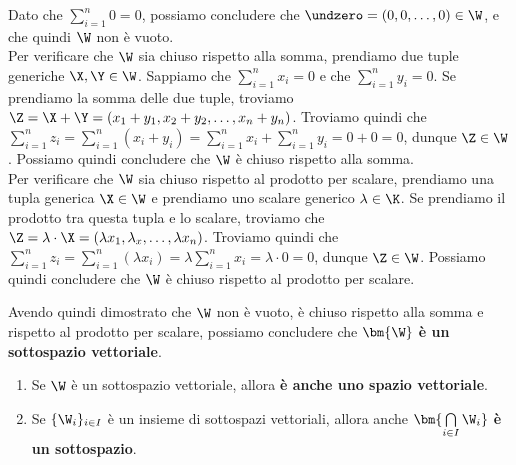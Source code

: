 \documentclass[11pt, a4paper, titlepage, oneside]{scrbook}
\begin{document}
Dato che $\sum_{i = 1}^n 0 = 0$, possiamo concludere che $\undzero = (0,0,\ldots,0) \in \W$, e che quindi $\W$ non è vuoto. \\
Per verificare che $\W$ sia chiuso rispetto alla somma, prendiamo due tuple generiche $\X, \Y \in \W$. Sappiamo che $\sum_{i = 1}^n x_i = 0$ e che $\sum_{i = 1}^n y_i = 0$. Se prendiamo la somma delle due tuple, troviamo $\Z = \X + \Y = (x_1 + y_1, x_2 + y_2, \ldots, x_n + y_n)$. Troviamo quindi che $\sum_{i = 1}^n z_i = \sum_{i = 1}^n(x_i + y_i) = \sum_{i = 1}^n x_i + \sum_{i = 1}^n y_i = 0 + 0 = 0$, dunque $\Z \in \W$. Possiamo quindi concludere che $\W$ è chiuso rispetto alla somma. \\
Per verificare che $\W$ sia chiuso rispetto al prodotto per scalare, prendiamo una tupla generica $\X \in \W$ e prendiamo uno scalare generico $\lambda \in \K$. Se prendiamo il prodotto tra questa tupla e lo scalare, troviamo che $\Z = \lambda \cdot \X = (\lambda x_1, \lambda_x, \ldots, \lambda x_n)$. Troviamo quindi che $\sum_{i = 1}^n z_i = \sum_{i = 1}^n (\lambda x_i) = \lambda \sum_{i = 1}^n x_i = \lambda \cdot 0 = 0$, dunque $\Z \in \W$. Possiamo quindi concludere che $\W$ è chiuso rispetto al prodotto per scalare.

Avendo quindi dimostrato che $\W$ non è vuoto, è chiuso rispetto alla somma e rispetto al prodotto per scalare, possiamo concludere che $\bm{\W}$ \textbf{è un sottospazio vettoriale}.

\begin{Osservazione}[]
\label{oss-sott-vet-2}
\begin{enumerate}
    \item Se $\W$ è un sottospazio vettoriale, allora \textbf{è anche uno spazio vettoriale}.
    \item Se $\{\W_i\}_{i \in I}$ è un insieme di sottospazi vettoriali, allora anche $\bm{\bigcap\limits_{i \in I} \W_i}$ \textbf{è un sottospazio}.
\end{enumerate}
\end{Osservazione}

\Dimostrazione \nopagebreak
\end{document}
